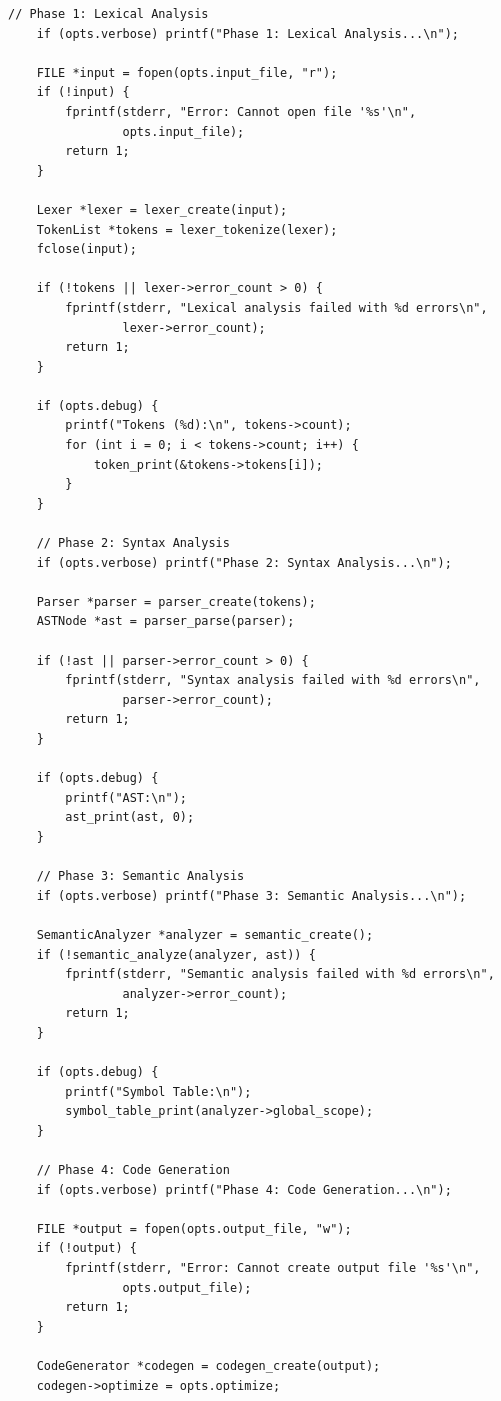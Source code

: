 \documentclass[12pt,a4paper,oneside]{book}
\begin{document}
\begin{lstlisting}[style=c, caption={compiler.c - Main Compiler Driver}]
    // Phase 1: Lexical Analysis
    if (opts.verbose) printf("Phase 1: Lexical Analysis...\n");
    
    FILE *input = fopen(opts.input_file, "r");
    if (!input) {
        fprintf(stderr, "Error: Cannot open file '%s'\n", 
                opts.input_file);
        return 1;
    }
    
    Lexer *lexer = lexer_create(input);
    TokenList *tokens = lexer_tokenize(lexer);
    fclose(input);
    
    if (!tokens || lexer->error_count > 0) {
        fprintf(stderr, "Lexical analysis failed with %d errors\n", 
                lexer->error_count);
        return 1;
    }
    
    if (opts.debug) {
        printf("Tokens (%d):\n", tokens->count);
        for (int i = 0; i < tokens->count; i++) {
            token_print(&tokens->tokens[i]);
        }
    }
    
    // Phase 2: Syntax Analysis
    if (opts.verbose) printf("Phase 2: Syntax Analysis...\n");
    
    Parser *parser = parser_create(tokens);
    ASTNode *ast = parser_parse(parser);
    
    if (!ast || parser->error_count > 0) {
        fprintf(stderr, "Syntax analysis failed with %d errors\n", 
                parser->error_count);
        return 1;
    }
    
    if (opts.debug) {
        printf("AST:\n");
        ast_print(ast, 0);
    }
    
    // Phase 3: Semantic Analysis
    if (opts.verbose) printf("Phase 3: Semantic Analysis...\n");
    
    SemanticAnalyzer *analyzer = semantic_create();
    if (!semantic_analyze(analyzer, ast)) {
        fprintf(stderr, "Semantic analysis failed with %d errors\n", 
                analyzer->error_count);
        return 1;
    }
    
    if (opts.debug) {
        printf("Symbol Table:\n");
        symbol_table_print(analyzer->global_scope);
    }
    
    // Phase 4: Code Generation
    if (opts.verbose) printf("Phase 4: Code Generation...\n");
    
    FILE *output = fopen(opts.output_file, "w");
    if (!output) {
        fprintf(stderr, "Error: Cannot create output file '%s'\n", 
                opts.output_file);
        return 1;
    }
    
    CodeGenerator *codegen = codegen_create(output);
    codegen->optimize = opts.optimize;
    

\end{lstlisting}
\end{document}
